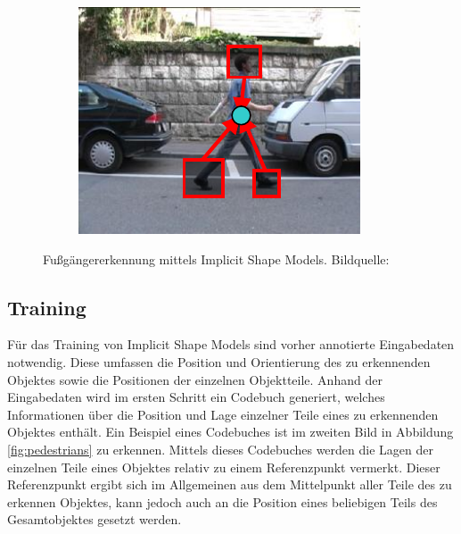 \begin{figure}
\begin{centering}
\begin{subfigure}[b]{.3\textwidth}
      \includegraphics[width=1\linewidth]{bilder/pedestrian/walk-annotation.pdf}
    \end{subfigure}
  \end{centering}
  \caption{Fußgängererkennung mittels Implicit Shape Models. Bildquelle: \cite{pedestrian}}\label{fig:pedestrians}
\end{figure}


\subsection{Training}

Für das Training von Implicit Shape Models sind vorher annotierte Eingabedaten notwendig.
Diese umfassen die Position und Orientierung des zu erkennenden Objektes sowie die Positionen der einzelnen Objektteile.
Anhand der Eingabedaten wird im ersten Schritt ein Codebuch generiert, welches Informationen über die Position und Lage einzelner Teile eines zu erkennenden Objektes enthält.
Ein Beispiel eines Codebuches ist im zweiten Bild in Abbildung \vref{fig:pedestrians} zu erkennen.
Mittels dieses Codebuches werden die Lagen der einzelnen Teile eines Objektes relativ zu einem Referenzpunkt vermerkt.
Dieser Referenzpunkt ergibt sich im Allgemeinen aus dem Mittelpunkt aller Teile des zu erkennen Objektes, kann jedoch auch an die Position eines beliebigen Teils des Gesamtobjektes gesetzt werden.

